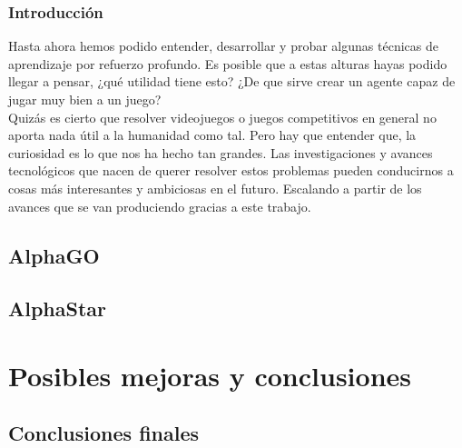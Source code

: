\documentclass[11pt,fleqn]{book} %
\begin{document}
\section*{Introducción}

Hasta ahora hemos podido entender, desarrollar y probar algunas técnicas de aprendizaje por refuerzo profundo. Es posible que a estas alturas hayas podido llegar a pensar, ¿qué utilidad tiene esto? ¿De que sirve crear un agente capaz de jugar muy bien a un juego? \\

Quizás es cierto que resolver videojuegos o juegos competitivos en general no aporta nada útil a la humanidad como tal. Pero hay que entender que, la curiosidad es lo que nos ha hecho tan grandes. Las investigaciones y avances tecnológicos que nacen de querer resolver estos problemas pueden conducirnos a cosas más interesantes y ambiciosas en el futuro. Escalando a partir de los avances que se van produciendo gracias a este trabajo. \\


\chapter{AlphaGO}

\chapter{AlphaStar}


\part{Posibles mejoras y conclusiones}

\chapter{Conclusiones finales}
\end{document}
